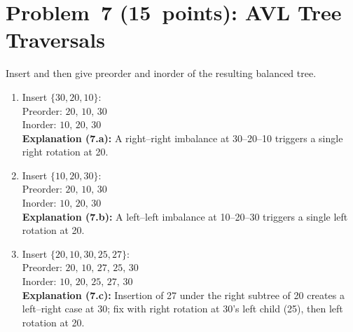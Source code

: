 \documentclass[12pt]{article}
\begin{document}
\newpage

\section*{Problem 7 (15 points): AVL Tree Traversals}
Insert and then give preorder and inorder of the resulting balanced tree.
\begin{enumerate}[label=\alph*)]
  \item Insert \(\{30,20,10\}\):  
    \\
    Preorder: \(\boxed{20,\,10,\,30}\)  
    \\ Inorder:  \(\boxed{10,\,20,\,30}\)  
    \\
    \textbf{Explanation (7.a):} A right–right imbalance at 30–20–10 triggers a single right rotation at 20.
  \item Insert \(\{10,20,30\}\):  
    \\
    Preorder: \(\boxed{20,\,10,\,30}\)  
    \\ Inorder:  \(\boxed{10,\,20,\,30}\)  
    \\
    \textbf{Explanation (7.b):} A left–left imbalance at 10–20–30 triggers a single left rotation at 20.
  \item Insert \(\{20,10,30,25,27\}\):  
    \\
    Preorder: \(\boxed{20,\,10,\,27,\,25,\,30}\)  
    \\ Inorder:  \(\boxed{10,\,20,\,25,\,27,\,30}\)  
    \\
    \textbf{Explanation (7.c):} Insertion of 27 under the right subtree of 20 creates a left–right case at 30; fix with right rotation at 30’s left child (25), then left rotation at 20.
\end{enumerate}

\newpage
\end{document}
